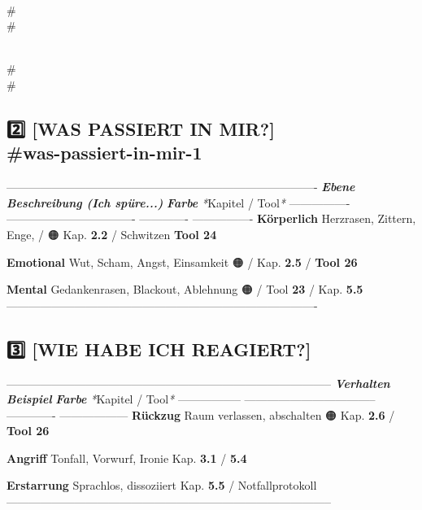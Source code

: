 {\\#\\#

\\#\\#

\subsection{2️⃣ \textbf{[WAS PASSIERT IN MIR?]} {\\#was-passiert-in-mir-1}}

----------------------------------------------------------------------------------
\textbf{\textit{Ebene}}      \textbf{\textit{Beschreibung (Ich spüre...)}}  \textbf{\textit{Farbe}}   \textit{*}Kapitel /
Tool\textit{*}
---------------- ---------------------------------- ------------- ----------------
\textbf{Körperlich}   Herzrasen, Zittern, Enge,          \textcolor{ctmmGreen}{} / 🟠       Kap. \textbf{2.2} /
Schwitzen                                        \textbf{Tool 24}

\textbf{Emotional}    Wut, Scham, Angst, Einsamkeit      🟠 / \textcolor{ctmmRed}{}       Kap. \textbf{2.5} /
\textbf{Tool 26}

\textbf{Mental}       Gedankenrasen, Blackout, Ablehnung 🟠 / \textcolor{ctmmRed}{}       Tool \textbf{23} /
Kap. \textbf{5.5}
----------------------------------------------------------------------------------

\subsection{3️⃣ \textbf{[WIE HABE ICH REAGIERT?]}}

--------------------------------------------------------------------------------------
\textbf{\textit{Verhalten}}   \textbf{\textit{Beispiel}}                      \textbf{\textit{Farbe}}   \textit{*}Kapitel /
Tool\textit{*}
----------------- ----------------------------------- ------------- ------------------
\textbf{Rückzug}       Raum verlassen, abschalten          🟠            Kap. \textbf{2.6} /
\textbf{Tool 26}

\textbf{Angriff}       Tonfall, Vorwurf, Ironie            \textcolor{ctmmRed}{}            Kap. \textbf{3.1} /
\textbf{5.4}

\textbf{Erstarrung}    Sprachlos, dissoziiert              \textcolor{ctmmRed}{}            Kap. \textbf{5.5} /
Notfallprotokoll
--------------------------------------------------------------------------------------

}
